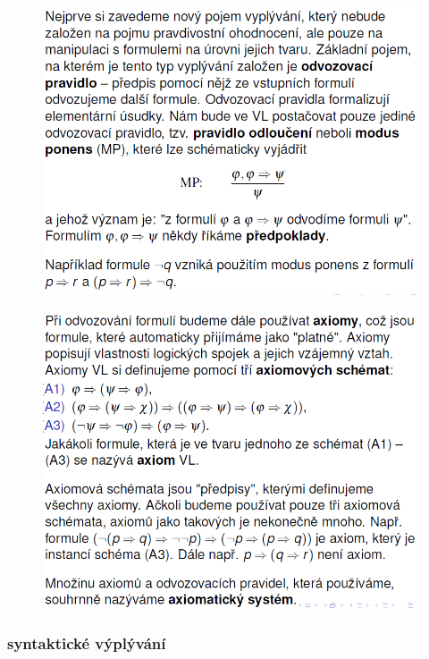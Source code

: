 \documentclass[10pt,a4paper]{article}
\theoremstyle{note}
\begin{document}
			\begin{figure}[H]
			\centering
			\includegraphics[width=12cm]{img/MP.png}
			\end{figure}

			\begin{figure}[H]
			\centering
			\includegraphics[width=12cm]{img/axiomy.png}
			\end{figure}

		\subsubsection{syntaktické výplývání}
\end{document}
